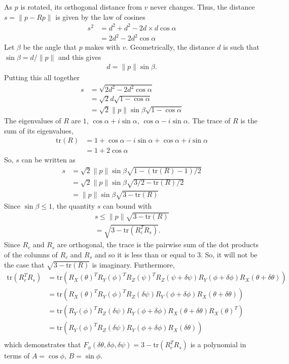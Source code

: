 \documentclass[12pt]{article}
\begin{document}
As $p$ is rotated, its orthogonal distance from $v$ never changes.  Thus, the distance $s = \|p - R p\|$ is given by the law of cosines
\begin{align}
s^2 &= d^2 + d^2 - 2d \times d \cos \alpha\\
       &= 2 d^2 - 2d^2 \cos \alpha
\end{align}
Let $\beta$ be the angle that $p$ makes with $v$.  Geometrically, the distance $d$ is such that $\sin \beta = d / \|p\|$ and this gives 
\begin{align}
d = \|p\| \sin \beta.
\end{align}
Putting this all together
\begin{align}
s &= \sqrt{2 d^2 - 2d^2 \cos \alpha}\\
   &= \sqrt{2}d \sqrt{1   - \cos \alpha}\\
   &= \sqrt{2}\|p\| \sin \beta \sqrt{1   - \cos \alpha}
\end{align} 
The eigenvalues of $R$ are $1$, $\cos \alpha + i \sin \alpha$, $\cos \alpha - i \sin \alpha$.  The trace of $R$ is
the sum of its eigenvalues, 
\begin{align}
\text{tr}(R) &= 1 + \cos \alpha - i \sin \alpha + \cos \alpha + i \sin \alpha\\
                   &= 1 + 2 \cos \alpha
\end{align}  
So, $s$ can be written as
\begin{align}
s &=   \sqrt{2}\|p\| \sin \beta \sqrt{1   -  (\text{tr}(R) - 1) / 2}\\
   &=   \sqrt{2}\|p\| \sin \beta \sqrt{3/2   -  \text{tr}(R)/2}\\
   &=   \|p\| \sin \beta \sqrt{3   -  \text{tr}(R)}
\end{align} 
Since $\sin \beta \leq 1$, the quantity $s$ can bound with
\begin{align}
s \leq \|p\|  \sqrt{3   -  \text{tr}(R)}\\
    =  \sqrt{3   -  \text{tr}(R_c^TR_s)}.
\end{align}
Since $R_c$ and $R_s$ are orthogonal, the trace is the pairwise sum of the dot products of the columns of $R_c$ and $R_s$ and so it is less than or equal to 3.  So,
it will not be the case that $ \sqrt{3   -  \text{tr}(R)}$ is imaginary.  Furthermore,
\begin{align*}
 \text{tr}(R_c^TR_s) &= \text{tr}(R_X(\theta)^T R_Y(\phi)^T R_Z(\psi)^TR_Z(\psi + \delta \psi) R_Y(\phi + \delta \phi)R_X(\theta + \delta \theta))\\
 &=  \text{tr}(R_X(\theta)^T R_Y(\phi)^T R_Z(\delta \psi) R_Y(\phi + \delta \phi)R_X(\theta + \delta \theta))\\
&=  \text{tr}( R_Y(\phi)^T R_Z(\delta \psi) R_Y(\phi + \delta \phi)R_X(\theta + \delta \theta)R_X(\theta)^T)\\
&= \text{tr}( R_Y(\phi)^T R_Z(\delta \psi) R_Y(\phi + \delta \phi)R_X( \delta \theta))\\
\end{align*}
which demonstrates that $F_\phi(\delta \theta, \delta \phi, \delta \psi)  = 3   -  \text{tr}(R_c^TR_s)$ is a polynomial in terms of $A = \cos \phi$, $B = \sin \phi$.\\
\end{document}
